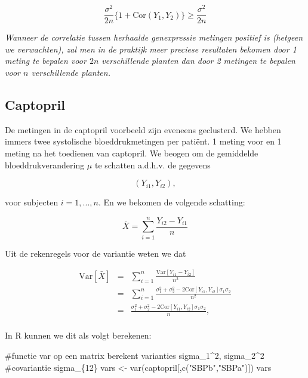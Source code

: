 \documentclass[
  dutch,
  letterpaper,
  12pt]{book}
\newenvironment{Shaded}{\begin{snugshade}}{\end{snugshade}}
\newcommand{\CommentTok}[1]{\textcolor[rgb]{0.37,0.37,0.37}{#1}}
\newcommand{\FunctionTok}[1]{\textcolor[rgb]{0.28,0.35,0.67}{#1}}
\newcommand{\NormalTok}[1]{\textcolor[rgb]{0.00,0.23,0.31}{#1}}
\newcommand{\OtherTok}[1]{\textcolor[rgb]{0.00,0.23,0.31}{#1}}
\newcommand{\StringTok}[1]{\textcolor[rgb]{0.13,0.47,0.30}{#1}}
\theoremstyle{definition}
\theoremstyle{definition}
\theoremstyle{definition}
\theoremstyle{remark}
\begin{document}
\[\frac{\sigma^2}{2n}\{1+\text{Cor}(Y_{1},Y_{2})\}\geq \frac{\sigma^2}{2n}\]

\emph{Wanneer de correlatie tussen herhaalde genexpressie metingen
positief is (hetgeen we verwachten), zal men in de praktijk meer
preciese resultaten bekomen door 1 meting te bepalen voor \(2n\)
verschillende planten dan door 2 metingen te bepalen voor \(n\)
verschillende planten.}

\subsection{Captopril}\label{captopril}

De metingen in de captopril voorbeeld zijn eveneens geclusterd. We
hebben immers twee systolische bloeddrukmetingen per patiënt. 1 meting
voor en 1 meting na het toedienen van captopril. We beogen om de
gemiddelde bloeddrukverandering \(\mu\) te schatten a.d.h.v. de gegevens

\[(Y_{i1} , Y_{i2}),\]

voor subjecten \(i = 1, ..., n\). En we bekomen de volgende schatting:

\[\bar X = \sum_{i=1}^n \frac{Y_{i2}-Y_{i1}}{n}\]

Uit de rekenregels voor de variantie weten we dat

\begin{eqnarray*}
\text{Var}\left[\bar X\right]&=&\sum_{i=1}^n \frac{\text{Var}\left[Y_{i1}-Y_{i2}\right]}{n^2}\\
&=&\sum_{i=1}^n \frac{\sigma^2_1+\sigma^2_2-2\text{Cor}\left[Y_{i1},Y_{i2}\right]\sigma_1\sigma_2}{n^2}\\
&=&\frac{\sigma^2_1+\sigma^2_2-2\text{Cor}\left[Y_{i1},Y_{i2}\right]\sigma_1\sigma_2}{n},\\
\end{eqnarray*}

In R kunnen we dit als volgt berekenen:

\begin{Shaded}
\begin{Highlighting}[]
\CommentTok{\#functie var op een matrix berekent varianties sigma\_1\^{}2, sigma\_2\^{}2}
\CommentTok{\#covariantie sigma\_\{12\}}
\NormalTok{vars }\OtherTok{\textless{}{-}} \FunctionTok{var}\NormalTok{(captopril[,}\FunctionTok{c}\NormalTok{(}\StringTok{"SBPb"}\NormalTok{,}\StringTok{"SBPa"}\NormalTok{)])}
\NormalTok{vars}
\end{Highlighting}
\end{Shaded}
\end{document}

